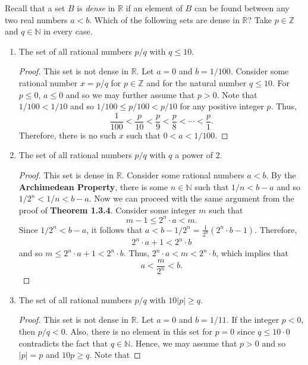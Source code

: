 \documentclass[12pt]{article}
\newcommand{\N}{\mathbb{N}}
\newcommand{\Z}{\mathbb{Z}}
\newcommand{\R}{\mathbb{R}}
\newenvironment{problem}[2][Problem]{\begin{trivlist}
		\item[\hskip \labelsep {\bfseries #1}\hskip \labelsep {\bfseries #2.}]}{\end{trivlist}}
\begin{document}
	\begin{problem}{1.4.6}
		Recall that a set $B$ is \textit{dense} in $\R$ if an element of $B$ can be found between any two real numbers $a<b$. Which of the following sets are dense in $\R$? Take $p\in \Z$ and $q\in \N$ in every case.
		\begin{enumerate}[label=(\alph*)]
			\item The set of all rational numbers $p/q$ with $q\leq 10$.
			\begin{proof}
				This set is not dense in $\R$. Let $a=0$ and $b=1/100$. Consider some rational number $x=p/q$ for $p\in \Z$ and for the natural number $q\leq 10$. For $p\leq 0$, $a \leq 0$ and so we may further assume that $p>0$.
				 Note that $1/100 < 1/10$ and so $1/100 \leq  p/100 < p/10$ for any positive integer $p$. Thus,
				 \begin{equation*}
				 	\frac{1}{100} < \frac{p}{10} < \frac{p}{9} < \frac{p}{8} < \cdots < \frac{p}{1}.
				 \end{equation*}
			 Therefore, there is no such $x$ such that $0<a<1/100$.
			\end{proof}
			\item The set of all rational numbers $p/q$ with $q$ a power of $2$.
			\begin{proof}
				This set is dense in $\R$. Consider some rational numbers $a<b$. By the \textbf{Archimedean Property}, there is some $n\in \N$ such that $1/n < b-a$ and so $1/2^{n} < 1/n < b-a$. Now we can proceed with the same argument from the proof of \textbf{Theorem 1.3.4}. Consider some integer $m$ such that 
				\begin{equation*}
				m-1 \leq 2^{n}\cdot a < m.
				\end{equation*}
				 Since $1/2^{n} < b-a$, it follows that $a<b-1/2^{n} = \frac{1}{2^{n}} (2^{n} \cdot b-1)$. Therefore,
				\begin{align*}
					2^{n}\cdot a + 1< 2^{n}\cdot b 
				\end{align*}
			and so $m\leq 2^{n}\cdot a+1 < 2^{n}\cdot b$. Thus, $2^{n}\cdot a < m < 2^{n}\cdot b$, which implies that
			\begin{equation*}
				a < \frac{m}{2^{n}} < b. 
			\end{equation*}
			\end{proof}
			\item  The set of all rational numbers $p/q$ with $10|p|\geq q$.
			\begin{proof}
				This set is not dense in $\R$. Let $a = 0$ and $b = 1/11$. If the integer $p<0$, then $p/q < 0$. Also, there is no element in this set for $p=0$ since $q\leq 10\cdot 0$ contradicts the fact that $q\in \N$. Hence, we may assume that $p>0$ and so $|p| = p$ and $10p \geq q$. Note that

\end{proof}
\end{enumerate}
\end{problem}
\end{document}
